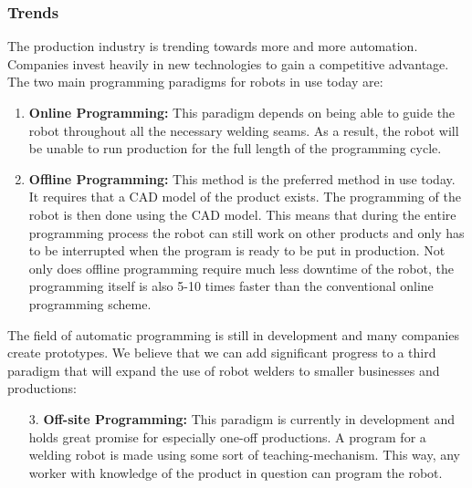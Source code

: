 \subsubsection{Trends}
\label{sec:trends}
The production industry is trending towards more and more automation.
Companies invest heavily in new technologies to gain a competitive advantage. 
The two main programming paradigms for robots in use today are:
\begin{enumerate}
\item \textbf{Online Programming:} This paradigm depends on being able to guide the robot throughout all the necessary welding seams. As a result, the robot will be unable to run production for the full length of the programming cycle.
\item \textbf{Offline Programming:} This method is the preferred method in use today. It requires that a CAD model of the product exists. 
The programming of the robot is then done using the CAD model. 
This means that during the entire programming process the robot can still work on other products and only has to be interrupted when the program is ready to be put in production. 
Not only does offline programming require much less downtime of the robot, the programming itself is also 5-10 times faster than the conventional online programming scheme.	
\end{enumerate}
The field of automatic programming is still in development and many companies create prototypes. We believe that we can add significant progress to a third paradigm that will expand the use of robot welders to smaller businesses and productions:
\begin{enumerate}
	\item[3.]{\textbf{Off-site Programming:}} This paradigm is currently in development and holds great promise for especially one-off productions. A program for a welding robot is made using some sort of teaching-mechanism. 
	This way, any worker with knowledge of the product in question can program the robot.
\end{enumerate}